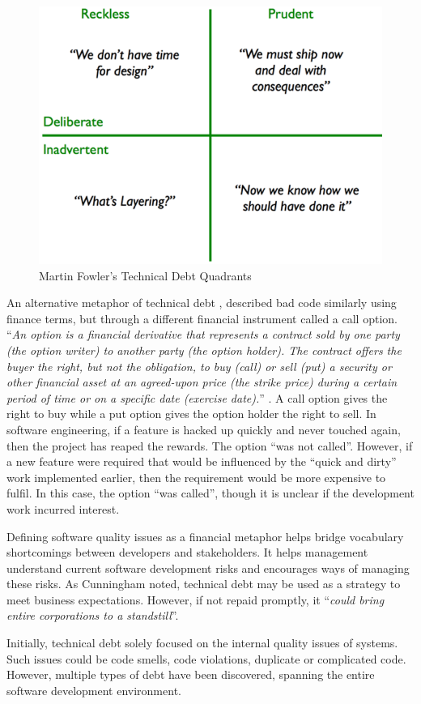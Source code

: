 \documentclass{mprop}
\begin{document}
\begin{figure}
	\centering
	\includegraphics[width=0.5\linewidth]{visualisations/TD_quadrants.png}
	\caption{Martin Fowler's Technical Debt Quadrants}
	\label{fig:td-quandrants}
\end{figure}


An alternative metaphor of technical debt \cite{UnhedgedCallOption}, described
bad code similarly using finance terms, but through a different financial
instrument called a call option. ``\textit{An option is a financial derivative
	that represents a contract sold by one party (the option writer) to another
	party (the option holder). The contract offers the buyer the right, but not the
	obligation, to buy (call) or sell (put) a security or other financial asset at
	an agreed-upon price (the strike price) during a certain period of time or on a
	specific date (exercise date).}'' \cite{option-investopedia}. A call option
gives the right to buy while a put option gives the option holder the right to
sell. In software engineering, if a feature is hacked up quickly and never
touched again, then the project has reaped the rewards. The option ``was not
called''. However, if a new feature were required that would be influenced by
the ``quick and dirty'' work implemented earlier, then the requirement would be
more expensive to fulfil. In this case, the option ``was called'', though it is
unclear if the development work incurred interest.


Defining software quality issues as a financial metaphor helps bridge vocabulary
shortcomings between developers and stakeholders. It helps management understand
current software development risks and encourages ways of managing these risks.
As Cunningham \cite{Cunningham1993} noted, technical debt may be used as a
strategy to meet business expectations. However, if not repaid promptly, it
``\textit{could bring entire corporations to a standstill}''.

Initially, technical debt solely focused on the internal quality issues of
systems. Such issues could be code smells, code violations, duplicate or
complicated code. However, multiple types of debt have been discovered, spanning
the entire software development environment.
\end{document}
